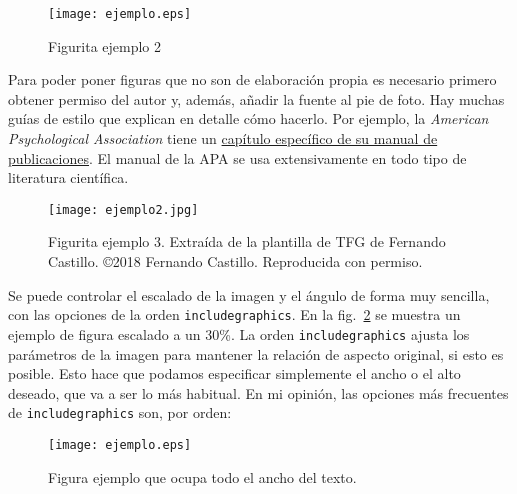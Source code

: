 \begin{figure}[H]
\centering
\texttt{[image: ejemplo.eps]}
\caption{Figurita ejemplo 2}
\label{fig:figurita-ejemplo-2}
\end{figure}

Para poder poner figuras que no son de elaboración propia es necesario primero obtener permiso del autor y, además, añadir la fuente al pie de foto. Hay muchas guías de estilo que explican en detalle cómo hacerlo. Por ejemplo, la \emph{American Psychological Association} tiene un \href{https://www.lib.sfu.ca/help/research-assistance/format-type/online-images/citing#citing-images-in-apa}{capítulo específico de su manual de publicaciones}.  El manual de la APA se usa extensivamente en todo tipo de literatura científica.

\begin{figure}[htb]
\centering
\texttt{[image: ejemplo2.jpg]}
\caption{Figurita ejemplo 3. Extraída de la plantilla de TFG de Fernando Castillo. \copyright 2018 Fernando Castillo. Reproducida con permiso.}
\label{fig:figura-ejemplo-3}
\end{figure}


Se puede controlar el escalado de la imagen y el ángulo de forma muy sencilla, con las opciones de la orden \texttt{includegraphics}.  En la fig.~\ref{fig:figura-ejemplo-3} se muestra un ejemplo de figura escalado a un 30\%.  La orden \texttt{includegraphics} ajusta los parámetros de la imagen para mantener la relación de aspecto original, si esto es posible.  Esto hace que podamos especificar simplemente el ancho o el alto deseado, que va a ser lo más habitual.  En mi opinión, las opciones más frecuentes de \texttt{includegraphics} son, por orden:

\begin{figure}
\centering
\texttt{[image: ejemplo.eps]}
\caption{Figura ejemplo que ocupa todo el ancho del texto.}
\label{fig:figura-ejemplo-4}
\end{figure}

